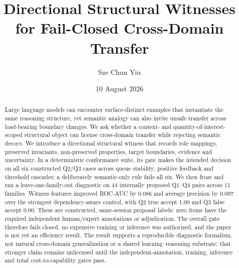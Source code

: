 \documentclass[11pt]{article}
\title{Directional Structural Witnesses for Fail-Closed Cross-Domain Transfer}
\author{Sze Chun Yiu}
\date{10 August 2026}
\begin{document}
\maketitle
\begin{abstract}
Large language models can encounter surface-distinct examples that instantiate the same reasoning structure, yet semantic analogy can also invite unsafe transfer across load-bearing boundary changes. We ask whether a context- and quantity-of-interest-scoped structural object can license cross-domain transfer while rejecting semantic decoys. We introduce a directional structural witness that records role mappings, preserved invariants, non-preserved properties, target boundaries, evidence and uncertainty. In a deterministic conformance suite, its gate makes the intended decision on all six constructed Q2/Q3 cases across queue stability, positive feedback and threshold cascades; a deliberately semantic-only rule fails all six. We then froze and ran a leave-one-family-out diagnostic on 44 internally proposed Q1--Q4 pairs across 11 families. Witness features improved ROC-AUC by 0.086 and average precision by 0.097 over the strongest dependency-aware control, with Q2 true accept 1.00 and Q3 false accept 0.00. These are constructed, same-session proposal labels: zero items have the required independent human/expert annotations or adjudication. The overall gate therefore fails closed, no expensive training or inference was authorized, and the paper is not yet an efficiency result. The result supports a reproducible diagnostic formalism, not natural cross-domain generalization or a shared learning--reasoning substrate; that stronger claim remains unlicensed until the independent-annotation, training, inference and total cost-to-capability gates pass.
\end{abstract}









\end{document}
